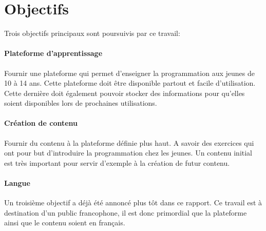 \section{Objectifs}
\label{intro-objectifs}

Trois objectifs principaux sont poursuivis par ce travail:

\paragraph{Plateforme d'apprentissage} Fournir une plateforme qui permet d'enseigner la programmation aux jeunes de 10 à 14 ans. Cette plateforme doit être disponible partout et facile d'utilisation. Cette dernière doit également pouvoir stocker des informations pour qu'elles soient disponibles lors de prochaines utilisations.

\paragraph{Création de contenu} Fournir du contenu à la plateforme définie plus haut. A savoir des exercices qui ont pour but d'introduire la programmation chez les jeunes. Un contenu initial est très important pour servir d'exemple à la création de futur contenu.

\paragraph{Langue} Un troisième objectif a déjà été annoncé plus tôt dans ce rapport. Ce travail est à destination d'un public francophone, il est donc primordial que la plateforme ainsi que le contenu soient en français.
